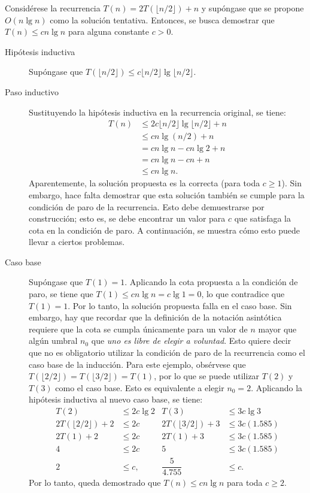 \newpage
\begin{expl}
  \label{ex:recurrence_substitution}
  Considérese la recurrencia \(T(n)=2T(\lfloor n/2 \rfloor)+n\) y supóngase que se propone \(O(n\lg{n})\) como la solución tentativa. 
  Entonces, se busca demostrar que \(T(n)\leq cn\lg{n}\) para alguna constante \(c>0\).
  \begin{description}
    \item[Hipótesis inductiva] Supóngase que \(T(\lfloor n/2\rfloor)\leq c\lfloor n/2\rfloor\lg\lfloor n/2\rfloor\).
    \item[Paso inductivo] Sustituyendo la hipótesis inductiva en la recurrencia original, se tiene:
    \begin{align*}
      T(n) &\leq2c\lfloor n/2\rfloor\lg\lfloor n/2\rfloor+n \\
      &\leq cn\lg(n/2)+n \\
      &=cn\lg n-cn\lg2+n \\
      &=cn\lg{n}-cn+n \\
      &\leq cn\lg n.
    \end{align*}
    Aparentemente, la solución propuesta es la correcta (para toda \(c\geq 1\)). 
    Sin embargo, hace falta demostrar que esta solución también se cumple para la condición de paro de la recurrencia. 
    Esto debe demuestrarse por construcción; esto es, se debe encontrar un valor para \(c\) que satisfaga la cota en la condición de paro. 
    A continuación, se muestra cómo esto puede llevar a ciertos problemas. 
    \item[Caso base] Supóngase que \(T(1)=1\). 
    Aplicando la cota propuesta a la condición de paro, se tiene que \(T(1)\leq cn\lg n=c\lg{1}=0\), lo que contradice que \(T(1)=1\). 
    Por lo tanto, la solución propuesta falla en el caso base. 
    Sin embargo, hay que recordar que la definición de la notación asintótica requiere que la cota se cumpla únicamente para un valor de \(n\) mayor que algún umbral \(n_{0}\) que \emph{uno es libre de elegir a voluntad}. 
    Esto quiere decir que no es obligatorio utilizar la condición de paro de la recurrencia como el caso base de la inducción. 
    Para este ejemplo, obsérvese que \(T(\lfloor2/2\rfloor)=T(\lfloor3/2\rfloor)=T(1)\), por lo que se puede utilizar \(T(2)\) y \(T(3)\) como el caso base. 
    Esto es equivalente a elegir \(n_0=2\).
    Aplicando la hipótesis inductiva al nuevo caso base, se tiene:
    \begin{align*}
      T(2) & \leq 2c\lg2 & T(3) & \leq 3c\lg3 \\
      2T(\lfloor 2/2 \rfloor) + 2 & \leq 2c & 2T(\lfloor 3/2 \rfloor) + 3 & \leq 3c(1.585) \\
      2T(1) + 2 & \leq2c & 2T(1) + 3 & \leq 3c(1.585) \\
      4 & \leq 2c & 5 & \leq 3c(1.585) \\
      2 & \leq c, & \dfrac{5}{4.755} & \leq c.
    \end{align*}
    Por lo tanto, queda demostrado que \(T(n)\leq cn\lg{n}\) para toda \(c\geq 2\). \exend
  \end{description}
\end{expl}

